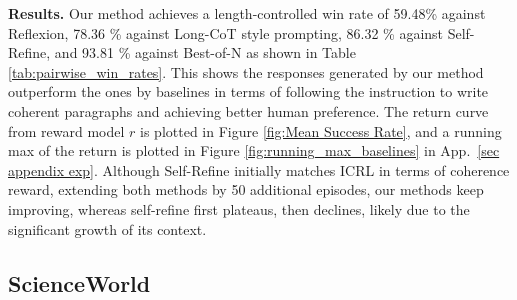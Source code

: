 \documentclass{article} %
\newcommand{\am}[1]{({\color{magenta}Amir: #1})}
\newcommand{\0}{\mathbf{0}}
\begin{document}
\textbf{Results.} Our method achieves a length-controlled win rate of 59.48\% against Reflexion, 78.36 \% against Long-CoT style prompting, 86.32 \% against Self-Refine, and 93.81 \% against Best-of-N as shown in Table \ref{tab:pairwise_win_rates}. This shows the responses generated by our method outperform the ones by baselines in terms of following the instruction to write coherent paragraphs and achieving better human preference. 
The return curve from reward model $r$ is plotted in Figure \ref{fig:Mean Success Rate}, and a running max of the return is plotted in Figure \ref{fig:running_max_baselines} in App.~\ref{sec appendix exp}. Although Self-Refine initially matches ICRL in terms of coherence reward, extending both methods by 50 additional episodes, our methods keep improving, whereas self-refine first plateaus, then declines, likely due to the significant growth of its context. 






\subsection{ScienceWorld}


\end{document}
